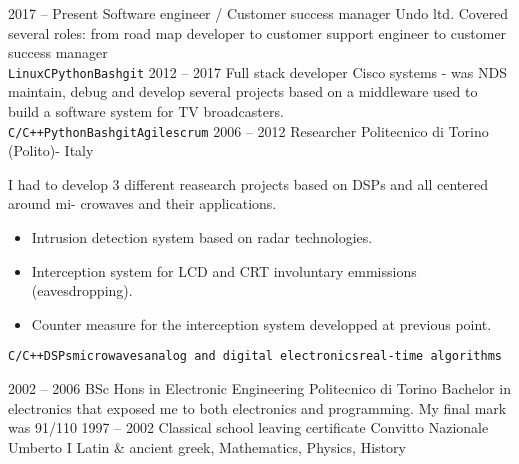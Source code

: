 \documentclass[8pt]{developercv} %
\begin{document}
\begin{entrylist}
	\entry
		{2017 -- Present}
		{Software engineer / Customer success manager}
		{Undo ltd.}
		{Covered several roles: from road map developer to customer support engineer to customer success manager\\ \texttt{Linux}\slashsep\texttt{C}\slashsep\texttt{Python}\slashsep\texttt{Bash}\slashsep\texttt{git}}
	\entry
		{2012 -- 2017}
		{Full stack developer}
		{Cisco systems - was NDS}
		{maintain, debug and develop several projects based on a middleware used to build a software system for TV broadcasters.\\ \texttt{C/C++}\slashsep\texttt{Python}\slashsep\texttt{Bash}\slashsep\texttt{git}\slashsep\texttt{Agile}\slashsep\texttt{scrum}}
	\entry
		{2006 -- 2012}
		{Researcher}
		{Politecnico di Torino (Polito)- Italy}
		{I had to develop 3 different reasearch projects based on DSPs and all centered around mi-
crowaves and their applications.
\begin{itemize}
\item Intrusion detection system based on radar technologies.
\item Interception system for LCD and CRT involuntary emmissions (eavesdropping).
\item Counter measure for the interception system developped at previous point.
\end{itemize}
\texttt{C/C++}\slashsep\texttt{DSPs}\slashsep\texttt{microwaves}\slashsep\texttt{analog and digital electronics}\slashsep\texttt{real-time algorithms}}
\end{entrylist}



\begin{entrylist}
	\entry
		{2002 -- 2006}
		{BSc Hons in Electronic Engineering}
		{Politecnico di Torino}
		{Bachelor in electronics that exposed me to both electronics and programming. My final mark was 91/110}
	\entry
		{1997 -- 2002}
		{Classical school leaving certificate}
		{Convitto Nazionale Umberto I}
		{Latin \& ancient greek, Mathematics, Physics, History}
\end{entrylist}

\end{document}
